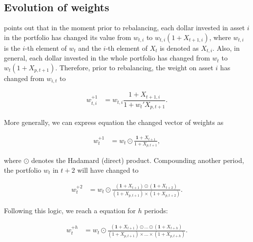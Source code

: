 \documentclass[12pt,oneside,a4paper]{memoir}
\begin{document}
\subsection*{Evolution of weights}

 points out that in the moment prior to rebalancing, each dollar invested in asset $i$ in the portfolio has changed its value from $w_{t,i}$ to $w_{t,i}(1+X_{t+1,i})$, where $w_{t,i}$ is the $i$-th element of $w_{t}$ and the $i$-th element of $X_{t}$ is denoted as $X_{t,i}$.
Also, in general, each dollar invested in the whole portfolio has changed from $w_{t}$ to $w_{t}(1+X_{p,t+1})$.
Therefore, prior to rebalancing, the weight on asset $i$ has changed from $w_{i,t}$ to 

\vspace{-18 pt}
\begin{align*}
	w_{t,i}^{+1} &= w_{t,i} \dfrac{1+X_{t+1,i}}{1+w_{t}'X_{p,t+1}}.
\end{align*}

More generally, we can express equation the changed vector of weights as

\vspace{-18 pt}
\begin{align}
	\label{eq:wplus1}
	w_{t}^{+1} &= w_{t} \odot \frac{\mathbf{1} + X_{t+1}}{1 + X_{p,t+1}},
\end{align}

\noindent
where $\odot$ denotes the Hadamard (direct) product.
Compounding another period, the portfolio $w_{t}$ in $t+2$ will have changed to

\vspace{-18 pt}
\begin{align*}
	w_{t}^{+2} &= w_{t} \odot 
	\frac{(\mathbf{1} + X_{t+1})\odot(\mathbf{1} + X_{t+2})}{(1 + X_{p,t+1})\times(1 + X_{p,t+2})}.
\end{align*}

Following this logic, we reach a equation for $h$ periods:

\vspace{-18 pt}
\begin{align}
	\label{eq:wplush}
	w_{t}^{+h} &= w_{t} \odot 
	\frac{(\mathbf{1} + X_{t+1}) \odot \dots \odot (\mathbf{1} + X_{t+h})}
	{(1 + X_{p,t+1})\times \dots \times(1 + X_{p,t+h})}.
\end{align}

\end{document}
